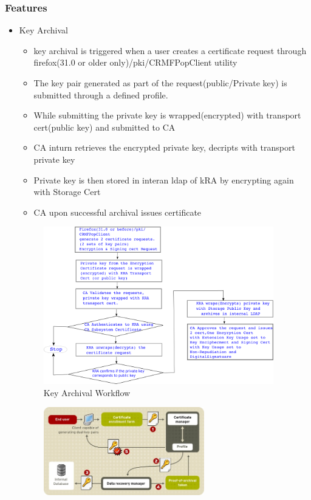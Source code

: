 \documentclass[a4paper]{article}
\begin{document}
\subsubsection{Features}
\begin{itemize}
    \item Key Archival
        \begin{itemize}
            \item key archival is triggered when a user creates a certificate request through
                firefox(31.0 or older only)/pki/CRMFPopClient utility
            \item The key pair generated as part of the request(public/Private key) is submitted
                through a defined profile. 
            \item While submitting the private key is wrapped(encrypted) with transport cert(public key)
                and submitted to CA
            \item CA inturn retrieves the encrypted private key, decripts with transport private key 
            \item Private key is then stored in interan ldap of kRA by encrypting again with Storage Cert
            \item CA upon successful archival issues certificate
        \end{itemize}
        \begin{figure}[H]
            \centering
            \includegraphics[width=100mm]{key-archival1.png}
            \caption{Key Archival Workflow}
        \end{figure}
        \begin{figure}[H]
            \centering
            \includegraphics[width=70mm]{key-archival-process.png}

\end{figure}
\end{itemize}
\end{document}
